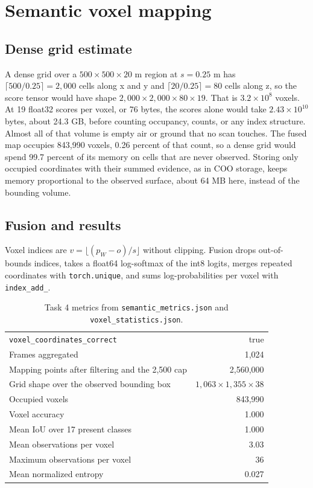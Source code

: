 \documentclass[11pt]{article}
\begin{document}
\section{Semantic voxel mapping}

\subsection*{Dense grid estimate}

A dense grid over a $500 \times 500 \times 20$ m region at $s = 0.25$ m has $\lceil 500/0.25 \rceil = 2{,}000$ cells along x and y and $\lceil 20/0.25 \rceil = 80$ cells along z, so the score tensor would have shape $2{,}000 \times 2{,}000 \times 80 \times 19$. That is $3.2 \times 10^8$ voxels. At 19 float32 scores per voxel, or 76 bytes, the scores alone would take $2.43 \times 10^{10}$ bytes, about 24.3 GB, before counting occupancy, counts, or any index structure. Almost all of that volume is empty air or ground that no scan touches.
The fused map occupies 843{,}990 voxels, 0.26 percent of that count, so a dense grid would spend 99.7 percent of its memory on cells that are never observed. Storing only occupied coordinates with their summed evidence, as in COO storage, keeps memory proportional to the observed surface, about 64 MB here, instead of the bounding volume.

\subsection*{Fusion and results}

Voxel indices are $v = \lfloor (p_W - o)/s \rfloor$ without clipping. Fusion drops out-of-bounds indices, takes a float64 log-softmax of the int8 logits, merges repeated coordinates with \texttt{torch.unique}, and sums log-probabilities per voxel with \texttt{index\_add\_}.

\begin{table}[htbp]
\centering
\begin{tabular}{lr}
\toprule
\texttt{voxel\_coordinates\_correct} & true \\
Frames aggregated & 1{,}024 \\
Mapping points after filtering and the 2{,}500 cap & 2{,}560{,}000 \\
Grid shape over the observed bounding box & $1{,}063 \times 1{,}355 \times 38$ \\
Occupied voxels & 843{,}990 \\
Voxel accuracy & 1.000 \\
Mean IoU over 17 present classes & 1.000 \\
Mean observations per voxel & 3.03 \\
Maximum observations per voxel & 36 \\
Mean normalized entropy & 0.027 \\
\bottomrule
\end{tabular}
\caption{Task 4 metrics from \texttt{semantic\_metrics.json} and \texttt{voxel\_statistics.json}.}
\label{tab:sem}
\end{table}
\end{document}
